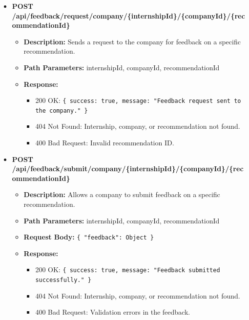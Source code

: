 \begin{itemize}
    \item \textbf{POST /api/feedback/request/company/\{internshipId\}/\{companyId\}/\{recommendationId\}}  
    \begin{itemize}
        \item \textbf{Description:} Sends a request to the company for feedback on a specific recommendation.
        \item \textbf{Path Parameters:} internshipId, companyId, recommendationId  
        \item \textbf{Response:}
        \begin{itemize}
            \item 200 OK: \texttt{\{ success: true, message: "Feedback request sent to the company." \}}
            \item 404 Not Found: Internship, company, or recommendation not found.
            \item 400 Bad Request: Invalid recommendation ID.
        \end{itemize}
    \end{itemize}

    \item \textbf{POST /api/feedback/submit/company/\{internshipId\}/\{companyId\}/\{recommendationId\}}  
    \begin{itemize}
        \item \textbf{Description:} Allows a company to submit feedback on a specific recommendation.
        \item \textbf{Path Parameters:} internshipId, companyId, recommendationId  
        \item \textbf{Request Body:} 
        \texttt{\{ 
            "feedback": Object
        \}}
        \item \textbf{Response:}
        \begin{itemize}
            \item 200 OK: \texttt{\{ success: true, message: "Feedback submitted successfully." \}}
            \item 404 Not Found: Internship, company, or recommendation not found.
            \item 400 Bad Request: Validation errors in the feedback.
        \end{itemize}
    \end{itemize}


\end{itemize}
